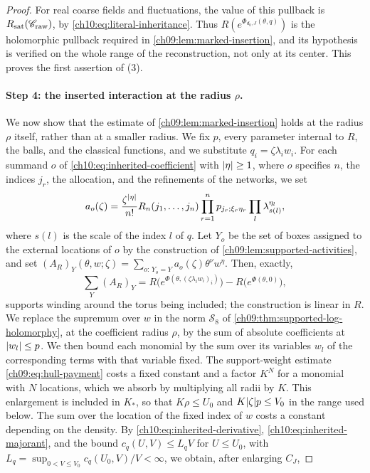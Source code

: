 \begin{proof}
For real coarse fields and fluctuations, the value of this pullback is $R_{\mathrm{sat}}(\mathscr C_{\mathrm{raw}})$, by \eqref{ch10:eq:literal-inheritance}. Thus $R(e^{\Phi_{d_0,J}(\theta,q)})$ is the holomorphic pullback required in \cref{ch09:lem:marked-insertion}, and its hypothesis is verified on the whole range of the reconstruction, not only at its center. This proves the first assertion of (3).

\paragraph{Step 4: the inserted interaction at the radius $\rho$.}
We now show that the estimate of \cref{ch09:lem:marked-insertion} holds at the radius $\rho$ itself, rather than at a smaller radius. We fix $p$, every parameter internal to $R$, the balls, and the classical functions, and we substitute $q_i=\zeta\lambda_iw_i$. For each summand $o$ of \eqref{ch10:eq:inherited-coefficient} with $\lvert \eta\rvert\ge1$, where $o$ specifies $n$, the indices $j_r$, the allocation, and the refinements of the networks, we set
\[
 a_o(\zeta)=\frac{\zeta^{\lvert \eta\rvert}}{n!}R_n(j_1,\ldots,j_n)\prod_{r=1}^np_{j_r;\xi_r\eta_r}\prod_l\lambda_{s(l)}^{\eta_l},
\]
where $s(l)$ is the scale of the index $l$ of $q$. Let $Y_o$ be the set of boxes assigned to the external locations of $o$ by the construction of \cref{ch09:lem:supported-activities}, and set $(A_R)_Y(\theta,w;\zeta)=\sum_{o:\,Y_o=Y}a_o(\zeta)\theta^\nu w^\eta$. Then, exactly,
\[
 \sum_Y(A_R)_Y=R\bigl(e^{\Phi(\theta,(\zeta\lambda_iw_i)_i)}\bigr)-R\bigl(e^{\Phi(\theta,0)}\bigr),
\]
supports winding around the torus being included; the construction is linear in $R$. We replace the supremum over $w$ in the norm $\mathscr S_8$ of \cref{ch09:thm:supported-log-holomorphy}, at the coefficient radius $\rho$, by the sum of absolute coefficients at $\lvert w_l\rvert\le p$. We then bound each monomial by the sum over its variables $w_l$ of the corresponding terms with that variable fixed. The support-weight estimate \eqref{ch09:eq:hull-payment} costs a fixed constant and a factor $K^N$ for a monomial with $N$ locations, which we absorb by multiplying all radii by $K$. This enlargement is included in $K_*$, so that $K\rho\le U_0$ and $K\lvert \zeta\rvert p\le V_0$ in the range used below. The sum over the location of the fixed index of $w$ costs a constant depending on the density. By \eqref{ch10:eq:inherited-derivative}, \eqref{ch10:eq:inherited-majorant}, and the bound $c_q(U,V)\le L_qV$ for $U\le U_0$, with $L_q=\sup_{0<V\le V_0}c_q(U_0,V)/V<\infty$, we obtain, after enlarging $C_J$,

\end{proof}
